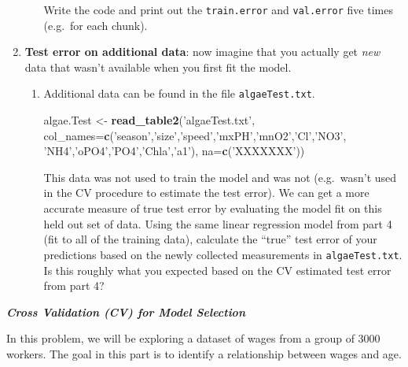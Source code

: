 \documentclass[]{article}
\newenvironment{Shaded}{\begin{snugshade}}{\end{snugshade}}
\newcommand{\KeywordTok}[1]{\textcolor[rgb]{0.13,0.29,0.53}{\textbf{#1}}}
\newcommand{\DataTypeTok}[1]{\textcolor[rgb]{0.13,0.29,0.53}{#1}}
\newcommand{\StringTok}[1]{\textcolor[rgb]{0.31,0.60,0.02}{#1}}
\newcommand{\NormalTok}[1]{#1}
\begin{document}
\begin{enumerate}
\begin{enumerate}
    Write the code and print out the \texttt{train.error} and
    \texttt{val.error} five times (e.g.~for each chunk).
  \end{enumerate}
\item
  \textbf{Test error on additional data}: now imagine that you actually
  get \emph{new} data that wasn't available when you first fit the
  model.

  \begin{enumerate}
  \item
    Additional data can be found in the file \texttt{algaeTest.txt}.

\begin{Shaded}
\begin{Highlighting}[]
\NormalTok{algae.Test <-}\StringTok{ }\KeywordTok{read_table2}\NormalTok{(}\StringTok{'algaeTest.txt'}\NormalTok{,}
                    \DataTypeTok{col_names=}\KeywordTok{c}\NormalTok{(}\StringTok{'season'}\NormalTok{,}\StringTok{'size'}\NormalTok{,}\StringTok{'speed'}\NormalTok{,}\StringTok{'mxPH'}\NormalTok{,}\StringTok{'mnO2'}\NormalTok{,}\StringTok{'Cl'}\NormalTok{,}\StringTok{'NO3'}\NormalTok{,}
                                \StringTok{'NH4'}\NormalTok{,}\StringTok{'oPO4'}\NormalTok{,}\StringTok{'PO4'}\NormalTok{,}\StringTok{'Chla'}\NormalTok{,}\StringTok{'a1'}\NormalTok{),}
                    \DataTypeTok{na=}\KeywordTok{c}\NormalTok{(}\StringTok{'XXXXXXX'}\NormalTok{))}
\end{Highlighting}
\end{Shaded}

    This data was not used to train the model and was not (e.g.~wasn't
    used in the CV procedure to estimate the test error). We can get a
    more accurate measure of true test error by evaluating the model fit
    on this held out set of data. Using the same linear regression model
    from part 4 (fit to all of the training data), calculate the
    ``true'' test error of your predictions based on the newly collected
    measurements in \texttt{algaeTest.txt}. Is this roughly what you
    expected based on the CV estimated test error from part 4?
  \end{enumerate}
\end{enumerate}

\textbf{\emph{Cross Validation (CV) for Model Selection}}

In this problem, we will be exploring a dataset of wages from a group of
3000 workers. The goal in this part is to identify a relationship
between wages and age.
\end{document}
